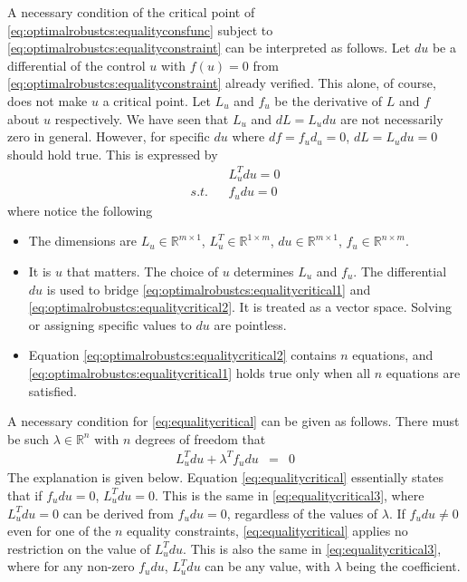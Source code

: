 A necessary condition of the critical point of \eqref{eq:optimalrobustcs:equalityconsfunc} subject to \eqref{eq:optimalrobustcs:equalityconstraint} can be interpreted as follows. Let $du$ be a differential of the control $u$ with $f(u) = 0$ from \eqref{eq:optimalrobustcs:equalityconstraint} already verified. This alone, of course, does not make $u$ a critical point. Let $L_u$ and $f_u$ be the derivative of $L$ and $f$ about $u$ respectively. We have seen that $L_u$ and $dL = L_udu$ are not necessarily zero in general. However, for specific $du$ where $df = f_ud_u = 0$, $dL = L_udu = 0$ should hold true. This is expressed by
\begin{subequations} \label{eq:equalitycritical}
\begin{eqnarray}
	&& L_u^Tdu = 0 \label{eq:optimalrobustcs:equalitycritical1} \\
	\textit{s.t.} && f_udu = 0 \label{eq:optimalrobustcs:equalitycritical2}
\end{eqnarray}
\end{subequations}
where notice the following
\begin{itemize}
	\item The dimensions are $L_u \in \mathbb{R}^{m\times 1}$, $L_u^T \in \mathbb{R}^{1\times m}$, $du \in \mathbb{R}^{m\times 1}$, $f_u \in \mathbb{R}^{n\times m}$.
	\item It is $u$ that matters. The choice of $u$ determines $L_u$ and $f_u$. The differential $du$ is used to bridge \eqref{eq:optimalrobustcs:equalitycritical1} and \eqref{eq:optimalrobustcs:equalitycritical2}. It is treated as a vector space. Solving or assigning specific values to $du$ are pointless.
	\item Equation \eqref{eq:optimalrobustcs:equalitycritical2} contains $n$ equations, and \eqref{eq:optimalrobustcs:equalitycritical1} holds true only when all $n$ equations are satisfied.
\end{itemize}

A necessary condition for \eqref{eq:equalitycritical} can be given as follows. There must be such $\lambda \in \mathbb{R}^n$ with $n$ degrees of freedom that
\begin{eqnarray}
	L_u^Tdu + \lambda^T f_udu &=& 0 \label{eq:equalitycritical3}
\end{eqnarray}
The explanation is given below. Equation \eqref{eq:equalitycritical} essentially states that if $f_udu = 0$, $L_u^Tdu = 0$. This is the same in \eqref{eq:equalitycritical3}, where $L_u^Tdu = 0$ can be derived from $f_udu = 0$, regardless of the values of $\lambda$. If $f_udu \neq 0$ even for one of the $n$ equality constraints, \eqref{eq:equalitycritical} applies no restriction on the value of $L_u^Tdu$. This is also the same in \eqref{eq:equalitycritical3}, where for any non-zero $f_udu$, $L_u^Tdu$ can be any value, with $\lambda$ being the coefficient.

